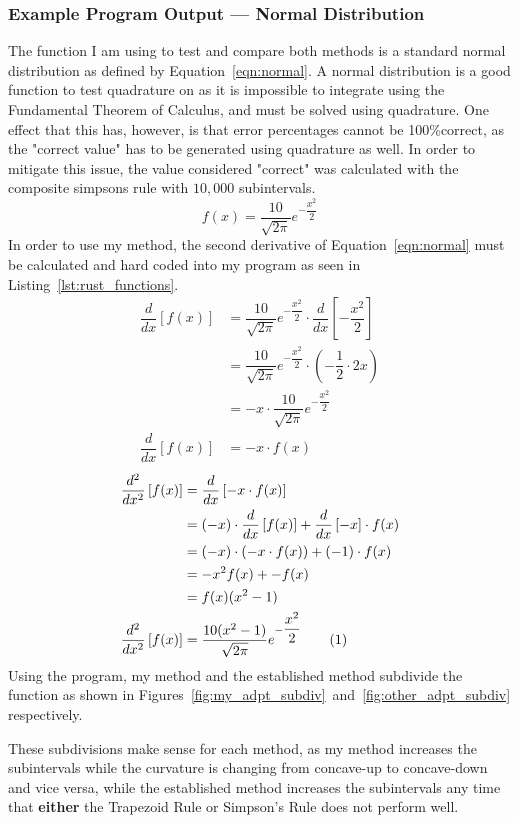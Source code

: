 \documentclass{paper}
\newcommand*\tageq{\refstepcounter{equation}\tag{\theequation}}
\newcommand{\der}[1]{\dfrac{d}{dx}\left[#1\right]}
\newcommand{\sder}[1]{\dfrac{d^2}{dx^2}\left[#1\right]}
\begin{document}
\subsubsection{Example Program Output --- Normal Distribution}
The function I am using to test and compare both methods is a standard normal distribution as defined by Equation~\ref{eqn:normal}.
A normal distribution is a good function to test quadrature on as it is impossible to integrate using the Fundamental Theorem of Calculus, and must be solved using quadrature.
One effect that this has, however, is that error percentages cannot be 100\%correct, as the "correct value" has to be generated using quadrature as well.
In order to mitigate this issue, the value considered "correct" was calculated with the composite simpsons rule with \(10,000\) subintervals.
%
\begin{equation}
    \label{eqn:normal}
    f(x) = \dfrac{10}{\sqrt{2\pi}}e^{-\dfrac{x^2}{2}}
\end{equation}
%
In order to use my method, the second derivative of Equation~\ref{eqn:normal} must be calculated and hard coded into my program as seen in Listing~\ref{lst:rust_functions}.
%
\begin{align*}
    \der{f(x)} &= \dfrac{10}{\sqrt{2\pi}}e^{-\dfrac{x^2}{2}} \cdot \der{-\dfrac{x^2}{2}}\\
    &= \dfrac{10}{\sqrt{2\pi}}e^{-\dfrac{x^2}{2}} \cdot \left(-\dfrac{1}{2} \cdot 2x\right)\\
    &= -x \cdot \dfrac{10}{\sqrt{2\pi}}e^{-\dfrac{x^2}{2}}\\
    \der{f(x)} &= -x \cdot f(x)
\end{align*}
\begin{align*}
    \sder{f(x)} &= \der{-x \cdot f(x)}\\
    &= (-x) \cdot \der{f(x)} + \der{-x} \cdot f(x)\\
    &= (-x) \cdot (-x \cdot f(x)) + (-1) \cdot f(x)\\
    &= -x^2f(x) + -f(x)\\
    &= f(x)(x^2-1)\\
    \sder{f(x)} &= \dfrac{10(x^2 - 1)}{\sqrt{2\pi}}e^{-\dfrac{x^2}{2}} \tageq\label{eqn:2nd_derivative_normal}
\end{align*}
%
Using the program, my method and the established method subdivide the function as shown in Figures~\ref{fig:my_adpt_subdiv}~and~\ref{fig:other_adpt_subdiv} respectively.
%


%
These subdivisions make sense for each method, as my method increases the subintervals while the curvature is changing from concave-up to concave-down and vice versa, while the established method increases the subintervals any time that \textbf{either} the Trapezoid Rule or Simpson's Rule does not perform well.
\end{document}
